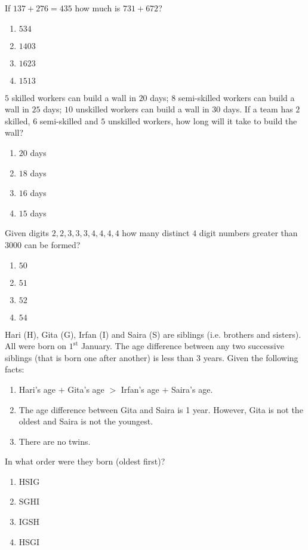     \item If $137 + 276 = 435$ how much is $731 + 672$?
    \begin{enumerate}
        \item $534$
        \item $1403$
        \item $1623$
        \item $1513$
    \end{enumerate}

    \item $5$ skilled workers can build a wall in $20$ days; $8$ semi-skilled workers can build a wall in $25$ days; $10$ unskilled workers can build a wall in $30$ days. If a team has $2$ skilled, $6$ semi-skilled and $5$ unskilled workers, how long will it take to build the wall?
    \begin{enumerate}
        \item $20$ days
        \item $18$ days
        \item $16$ days
        \item $15$ days
    \end{enumerate}

    \item Given digits $2, 2, 3, 3, 3, 4, 4, 4, 4$ how many distinct $4$ digit numbers greater than $3000$ can be formed?
    \begin{enumerate}
        \item $50$
        \item $51$
        \item $52$
        \item $54$
    \end{enumerate}

    \item \label{65} Hari (H), Gita (G), Irfan (I) and Saira (S) are siblings (i.e. brothers and sisters). All were born on $1^{\text{st}}$ January. The age difference between any two successive siblings (that is born one after another) is less than $3$ years. Given the following facts:
    \begin{enumerate}
        \item Hari's age $+$ Gita's age $>$ Irfan's age $+$ Saira's age.
        \item The age difference between Gita and Saira is 1 year. However, Gita is not the oldest and Saira is not the youngest.
        \item There are no twins.
    \end{enumerate}
    In what order were they born (oldest first)?
    \begin{enumerate}
        \item HSIG
        \item SGHI
        \item IGSH
        \item HSGI
    \end{enumerate}
